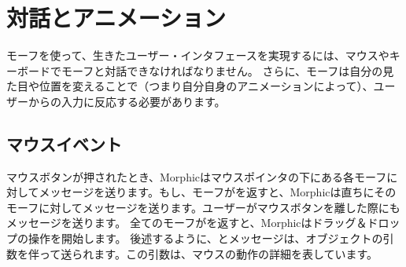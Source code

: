 \documentclass[a4paper,10pt,twoside]{book}
\begin{document}





\section{対話とアニメーション}

モーフを使って、生きたユーザー・インタフェースを実現するには、マウスやキーボードでモーフと対話できなければなりません。
さらに、モーフは自分の見た目や位置を変えることで（つまり自分自身のアニメーションによって）、ユーザーからの入力に反応する必要があります。


\subsection{マウスイベント}

マウスボタンが押されたとき、Morphicはマウスポインタの下にある各モーフに対してメッセージを送ります。もし、モーフがを返すと、Morphicは直ちにそのモーフに対してメッセージを送ります。ユーザーがマウスボタンを離した際にもメッセージを送ります。
全てのモーフがを返すと、Morphicはドラッグ＆ドロップの操作を開始します。
後述するように、とメッセージは、オブジェクトの引数を伴って送られます。この引数は、マウスの動作の詳細を表しています。
\end{document}
